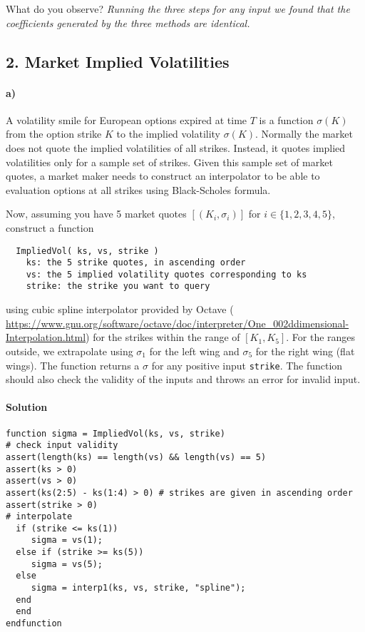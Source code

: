 \documentclass[12pt,a4paper,hidelinks,fleqn]{article}            %
\begin{document}
What do you observe? \emph{Running the three steps for any input we found that the coefficients generated by the three methods are identical.} 


\subsection*{2. Market Implied Volatilities}

\paragraph{a)} A volatility smile for European options expired at time $T$ is a function $\sigma(K)$ from the option strike $K$ to the implied volatility $\sigma(K)$.
Normally the market does not quote the implied volatilities of all strikes.
Instead, it quotes implied volatilities only for a sample set of strikes. 
Given this sample set of market quotes, 
a market maker needs to construct an interpolator to be able to evaluation options at all strikes using Black-Scholes formula.

Now, assuming you have 5 market quotes $[(K_i, \sigma_i)]$ for $i\in\{1, 2, 3, 4, 5\}$,
construct a function 
\vspace{-0.6cm}
\begin{verbatim}
  ImpliedVol( ks, vs, strike )
    ks: the 5 strike quotes, in ascending order
    vs: the 5 implied volatility quotes corresponding to ks
    strike: the strike you want to query
\end{verbatim}
\vspace{-0.6cm}
using cubic spline interpolator provided by Octave (
\url{https://www.gnu.org/software/octave/doc/interpreter/One_002ddimensional-Interpolation.html})
for the strikes within the range of $[K_1, K_5]$. For the ranges outside, we extrapolate using $\sigma_1$ for the left wing and $\sigma_5$ for the right wing (flat wings).
The function returns a $\sigma$ for any positive input \verb=strike=.
The function should also check the validity of the inputs and throws an error for invalid input.

\paragraph{Solution}
\begin{verbatim}
function sigma = ImpliedVol(ks, vs, strike)
# check input validity
assert(length(ks) == length(vs) && length(vs) == 5)
assert(ks > 0)
assert(vs > 0)
assert(ks(2:5) - ks(1:4) > 0) # strikes are given in ascending order
assert(strike > 0)
# interpolate
  if (strike <= ks(1))
     sigma = vs(1);
  else if (strike >= ks(5))
     sigma = vs(5);
  else
     sigma = interp1(ks, vs, strike, "spline");
  end
  end
endfunction
\end{verbatim}
\end{document}
